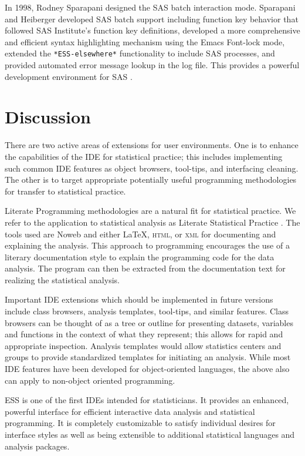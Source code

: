 \documentclass{article}
\newcommand*{\SAS}{\textsc{SAS}{\textregistered} }
\newcommand{\stexttt}[1]{{\small\texttt{#1}}}
\begin{document}
In 1998, Rodney Sparapani designed the \SAS batch interaction mode.
Sparapani and Heiberger developed \SAS batch support including function
key behavior that followed SAS Institute's function key definitions,
developed a more comprehensive and efficient syntax highlighting
mechanism using the Emacs Font-lock mode, extended the
\stexttt{*ESS-elsewhere*} functionality to include \SAS processes, and
provided automated error message lookup in the log file.  This provides
a powerful development environment for \SAS.


\section{Discussion}
\label{sec:discussion}

There are two active areas of extensions for user environments.  One
is to enhance the capabilities of the IDE for statistical practice;
this includes implementing such common IDE features as object
browsers, tool-tips, and interfacing cleaning.  The other is to target
appropriate potentially useful programming methodologies for transfer
to statistical practice.

Literate Programming methodologies \citep{Knuth:1992,NRamsey:1994} are
a natural fit for statistical practice.  We refer to the application
to statistical analysis as Literate Statistical Practice
\citep{rossini:dsc:2001}.  The tools used are Noweb
\citep{NRamsey:1994} and either \LaTeX, \textsc{html}, or \textsc{xml}
for documenting and explaining the analysis.  This approach to
programming encourages the use of a literary documentation style to
explain the programming code for the data analysis.  The program can
then be extracted from the documentation text for realizing the
statistical analysis.

Important IDE extensions which should be implemented in future
versions include class browsers, analysis templates, tool-tips, and
similar features.  Class browsers can be thought of as a tree or
outline for presenting datasets, variables and functions in the
context of what they represent; this allows for rapid and appropriate
inspection.  Analysis templates would allow statistics centers and
groups to provide standardized templates for initiating an analysis.
While most IDE features have been developed for object-oriented
languages, the above also can apply to non-object oriented
programming.

ESS is one of the first IDEs intended for statisticians.  It provides
an enhanced, powerful interface for efficient interactive data
analysis and statistical programming.  It is completely customizable
to satisfy individual desires for interface styles as well as being
extensible to additional statistical languages and analysis packages.




\end{document}
